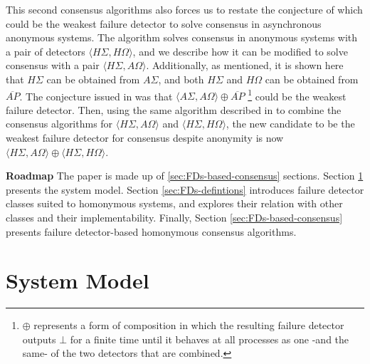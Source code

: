 \documentclass[10pt, conference, compsocconf]{IEEEtran}
\newcommand{\tightparagraph}[1]{\smallskip \noindent \textbf{#1} \hspace{1ex}}
\newcommand{\HO}{{H\Omega}}
\newcommand{\AO}{{A\Omega}}
\newcommand{\HS}{{H\Sigma}}
\newcommand{\AS}{{A\Sigma}}
\newcommand{\NAP}{{ \overline{\mathit{AP}}}}
\begin{document}
This second consensus algorithms also forces us to restate 
the conjecture of which could be the weakest failure detector to solve
consensus in asynchronous anonymous systems. The algorithm solves 
consensus in anonymous systems with a pair of detectors 
$\langle \HS, \HO\rangle$,
and we describe how it can be modified to solve consensus 
with a pair $\langle \HS, \AO\rangle$. Additionally, as mentioned,
it is shown here that $\HS$ can be obtained from $\AS$, and both
$\HS$ and $\HO$ can be obtained from $\NAP$. 
The conjecture issued in \cite{DBLP:conf/wdag/BonnetR10} was that
$\langle \AS, \AO\rangle \oplus \NAP$ \footnote{$\oplus$ represents 
a form of composition in which the resulting failure detector 
outputs $\bot$ for a finite time until it behaves at all processes 
as  one -and the same- of the two detectors  that are combined.} 
could be the weakest failure detector. 
Then, using the same algorithm described in \cite{DBLP:conf/wdag/BonnetR10} 
to combine the
consensus algorithms for $\langle \HS, \AO\rangle$ and  
$\langle \HS, \HO\rangle$, the new candidate  to be the 
 weakest failure detector for consensus despite anonymity is  now 
$\langle \HS, \AO\rangle \oplus \langle \HS, \HO\rangle$.

\tightparagraph{Roadmap}
The   paper  is   made   up  of   \ref{sec:FDs-based-consensus}  sections.   
Section \ref{sec:model} presents the system model. Section 
\ref{sec:FDs-defintions} introduces failure  detector classes suited 
to homonymous
systems, and explores their relation with other classes and their 
implementability.
Finally, Section \ref{sec:FDs-based-consensus} presents  failure 
detector-based homonymous consensus algorithms.




\section{System Model}
\label{sec:model} 
\end{document}
